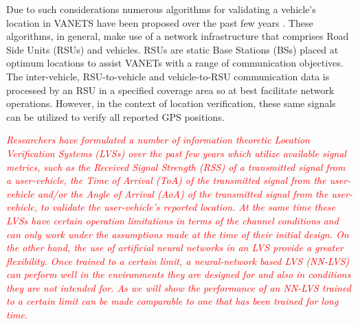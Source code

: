 \documentclass[journal]{IEEEtran}
\begin{document}
Due to such considerations numerous algorithms for validating a vehicle's location in VANETS have been proposed over the past few years \cite{yan2013location}. These algorithms, in general, make use of a network infrastructure that comprises Road Side Units (RSUs) and vehicles. RSUs are static Base Stations (BSs) placed at optimum locations to assist VANETs with a range of communication objectives. The inter-vehicle, RSU-to-vehicle and vehicle-to-RSU communication data is processed by an RSU in a specified coverage area so at best facilitate network operations. However, in the context of location verification, these same signals can be utilized to verify all reported GPS positions.

\textcolor{red}{\textit{Researchers have formulated a number of information theoretic Location Verification Systems (LVSs) over the past few years \cite{yan2013location} which utilize available signal metrics, such as the Received Signal Strength (RSS) of a transmitted signal from a user-vehicle, the Time of Arrival (ToA) of the transmitted signal from the user-vehicle and/or the Angle of Arrival (AoA) of the transmitted signal from the user-vehicle, to validate the user-vehicle's reported location. At the same time these LVSs have certain operation limitations in terms of the channel conditions and can only work under the assumptions made at the time of their initial design. On the other hand, the use of artificial neural networks in an LVS provide a greater flexibility. Once trained to a certain limit, a neural-network based LVS (NN-LVS) can perform well in the environments they are designed for and also in conditions they are not intended for. As we will show the performance of an NN-LVS trained to a certain limit can be made comparable to one that has been trained for long time.}}
\end{document}
